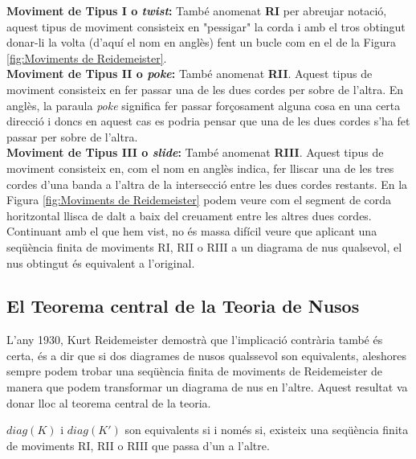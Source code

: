 \noindent
\textbf{Moviment de Tipus I o \textit{twist}:} També anomenat \textbf{RI} per abreujar notació, aquest tipus de moviment consisteix en "pessigar" la corda i amb el tros obtingut donar-li la volta (d'aquí el nom en anglès) fent un bucle com en el de la Figura \ref{fig:Moviments de Reidemeister}.\\

\noindent
\textbf{Moviment de Tipus II o \textit{poke}:} També anomenat \textbf{RII}. Aquest tipus de moviment consisteix en fer passar una de les dues cordes per sobre de l'altra. En anglès, la paraula \textit{poke} significa fer passar forçosament alguna cosa en una certa direcció i doncs en aquest cas es podria pensar que una de les dues cordes s'ha fet passar per sobre de l'altra.\\

\noindent
\textbf{Moviment de Tipus III o \textit{slide}:} També anomenat \textbf{RIII}. Aquest tipus de moviment consisteix en, com el nom en anglès indica, fer lliscar una de les tres cordes d'una banda a l'altra de la intersecció entre les dues cordes restants. En la Figura \ref{fig:Moviments de Reidemeister} podem veure com el segment de corda horitzontal llisca de dalt a baix del creuament entre les altres dues cordes.\\

Continuant amb el que hem vist, no és massa difícil veure que aplicant una seqüència finita de moviments RI, RII o RIII a un diagrama de nus qualsevol, el nus obtingut és equivalent a l'original.

\subsection{El Teorema central de la Teoria de Nusos}\label{sec:teoremacentraldelateoria}

L'any 1930, Kurt Reidemeister demostrà que l'implicació contrària també és certa, és a dir que si dos diagrames de nusos qualssevol son equivalents, aleshores sempre podem trobar una seqüència finita de moviments de Reidemeister de manera que podem transformar un diagrama de nus en l'altre. Aquest resultat va donar lloc al teorema central de la teoria.

\begin{theorem}\label{teo:teoremadeReidemeister}
   $diag(K)$ i $diag(K')$ son equivalents si i només si, existeix una seqüència finita de moviments RI, RII o RIII que passa d'un a l'altre.
\end{theorem}

